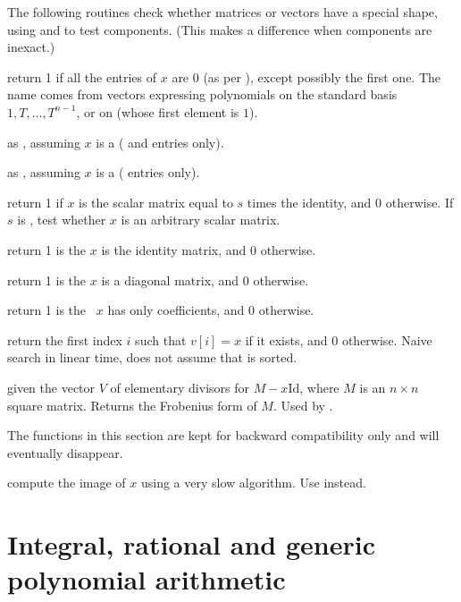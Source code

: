 The following routines check whether matrices or vectors have a special
shape, using  and  to test components. (This makes a
difference when components are inexact.)

 return 1 if all the entries of $x$ are $0$
(as per ), except possibly the first one. The name comes from
vectors expressing polynomials on the standard basis $1,T,\dots, T^{n-1}$, or
on  (whose first element is $1$).

 as , assuming $x$ is a
 ( and  entries only).

 as , assuming $x$ is a
 ( entries only).

 return 1 if $x$ is the scalar matrix
equal to $s$ times the identity, and 0 otherwise. If $s$ is , test
whether $x$ is an arbitrary scalar matrix.

 return 1 is the  $x$ is the
identity matrix, and 0 otherwise.

 return 1 is the  $x$ is a
diagonal matrix, and 0 otherwise.

 return 1 is the ~$x$ has only
 coefficients, and 0 otherwise.

 return the first index $i$ such that
$v[i] = x$ if it exists, and $0$ otherwise. Naive search in linear time, does
not assume that  is sorted.

 given the vector $V$ of elementary
divisors for $M - x\text{Id}$, where $M$ is an $n\times n$ square matrix.
Returns the Frobenius form of $M$. Used by .


The functions in this section are kept for backward compatibility only
and will eventually disappear.

 compute the image of $x$ using a very slow
algorithm. Use  instead.

\section{Integral, rational and generic polynomial arithmetic}

